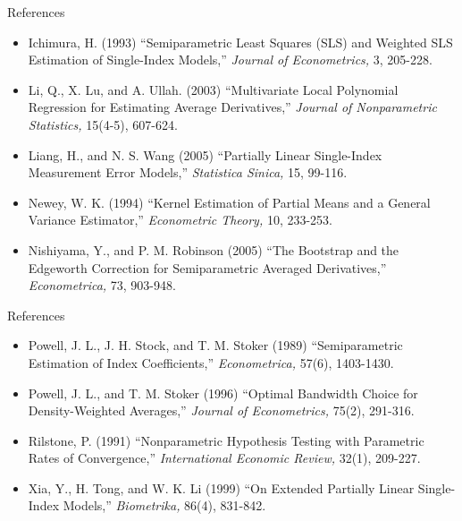 \documentclass[xcolor=svgnames,dvipdfmx,cjk]{beamer}
\theoremstyle{example}
\begin{document}
\begin{frame}{References}
 \begin{itemize}
  \item Ichimura, H. (1993) 
        ``Semiparametric Least Squares (SLS) and Weighted SLS Estimation of Single-Index Models,''
        \textit{Journal of Econometrics,} 3, 205-228. 
  \item Li, Q., X. Lu, and A. Ullah. (2003)
        ``Multivariate Local Polynomial Regression for Estimating Average Derivatives,''
        \textit{Journal of Nonparametric Statistics,} 15(4-5), 607-624.
  \item Liang, H., and N. S. Wang (2005) 
        ``Partially Linear Single-Index Measurement Error Models,'' 
        \textit{Statistica Sinica,} 15, 99-116.
  \item Newey, W. K. (1994)
        ``Kernel Estimation of Partial Means and a General Variance Estimator,''
        \textit{Econometric Theory,} 10, 233-253.
  \item Nishiyama, Y., and P. M. Robinson (2005)
        ``The Bootstrap and the Edgeworth Correction for Semiparametric Averaged Derivatives,''
        \textit{Econometrica,} 73, 903-948.
 \end{itemize} 
\end{frame}

\begin{frame}{References}
  \begin{itemize}
  \item Powell, J. L., J. H. Stock, and T. M. Stoker (1989)
        ``Semiparametric Estimation of Index Coefficients,''
        \textit{Econometrica,} 57(6), 1403-1430. 
  \item Powell, J. L., and T. M. Stoker (1996)
        ``Optimal Bandwidth Choice for Density-Weighted Averages,''
        \textit{Journal of Econometrics,} 75(2), 291-316.
  \item Rilstone, P. (1991)
        ``Nonparametric Hypothesis Testing with Parametric Rates of Convergence,''
        \textit{International Economic Review,} 32(1), 209-227.
  \item Xia, Y., H. Tong, and W. K. Li (1999)
        ``On Extended Partially Linear Single-Index Models,''
        \textit{Biometrika,} 86(4), 831-842.
  \end{itemize}
\end{frame}
\end{document}
